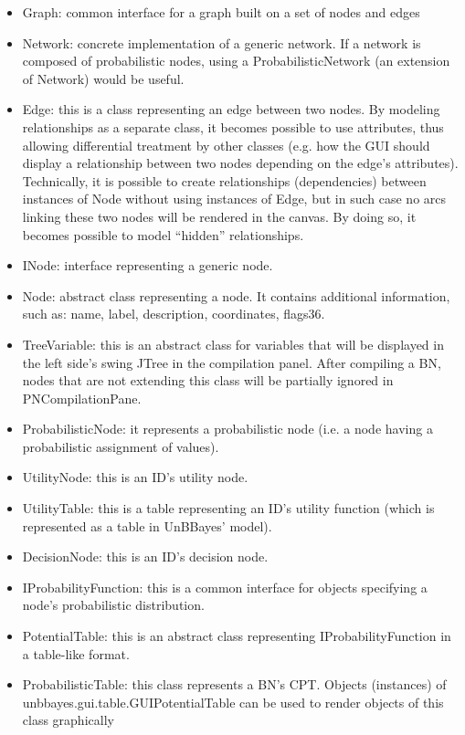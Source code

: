 \begin{itemize}
	\item Graph: common interface for a graph built on a set of nodes and edges
	
	\item Network: concrete implementation of a generic network. If a network is composed of probabilistic nodes,
	using a ProbabilisticNetwork (an extension of Network) would be useful.
	
	\item Edge: this is a class representing an edge between two nodes. By modeling relationships as a separate
	class, it becomes possible to use attributes, thus allowing differential treatment by other classes (e.g. how
	the GUI should display a relationship between two nodes depending on the edge’s attributes). Technically,
	it is possible to create relationships (dependencies) between instances of Node without using instances of
	Edge, but in such case no arcs linking these two nodes will be rendered in the canvas. By doing so, it
	becomes possible to model “hidden” relationships.
	
	\item INode: interface representing a generic node.
	
	\item Node: abstract class representing a node. It contains additional information, such as: name, label, description,
	coordinates, flags36.
	
	\item TreeVariable: this is an abstract class for variables that will be displayed in the left side’s swing JTree
	in the compilation panel. After compiling a BN, nodes that are not extending this class will be partially
	ignored in PNCompilationPane.
	
	\item ProbabilisticNode: it represents a probabilistic node (i.e. a node having a probabilistic assignment of
	values).
	
	\item UtilityNode: this is an ID’s utility node.
	
	\item UtilityTable: this is a table representing an ID’s utility function (which is represented as a table in
	UnBBayes’ model).
	
	\item DecisionNode: this is an ID’s decision node.
	
	\item IProbabilityFunction: this is a common interface for objects specifying a node’s probabilistic distribution.
	
	\item PotentialTable: this is an abstract class representing IProbabilityFunction in a table-like format.
	
	\item ProbabilisticTable: this class represents a BN’s CPT. Objects (instances) of
	unbbayes.gui.table.GUIPotentialTable can be used to render objects of this class graphically
\end{itemize}



